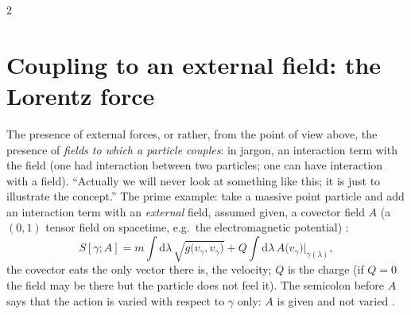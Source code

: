 \begin{paracol}{2}
\section{Coupling to an external field: the Lorentz force}\label{sec:c14-lorentz}

The presence of external forces, or rather, from the point of view above, the presence of \emph{fields to which a particle couples}: in jargon, an interaction term with the field (one had interaction between two particles; one can have interaction with a field). ``Actually we will never look at something like this; it is just to illustrate the concept.'' The prime example: take a massive point particle and add an interaction term with an \emph{external} field, assumed given, a covector field $A$ (a $(0,1)$ tensor field on spacetime, e.g.\ the electromagnetic potential) :
\begin{equation}\label{eq:c14-coupled}
  S[\gamma;A]=m\int\mathrm d\lambda\,\sqrt{g\bigl(v_\gamma,v_\gamma\bigr)}+Q\int\mathrm d\lambda\,A\bigl(v_\gamma\bigr)\big|_{\gamma(\lambda)},
\end{equation}
the covector eats the only vector there is, the velocity; $Q$ is the charge (if $Q=0$ the field may be there but the particle does not feel it). The semicolon before $A$ says that the action is varied with respect to $\gamma$ only: $A$ is given and not varied .


\end{paracol}
